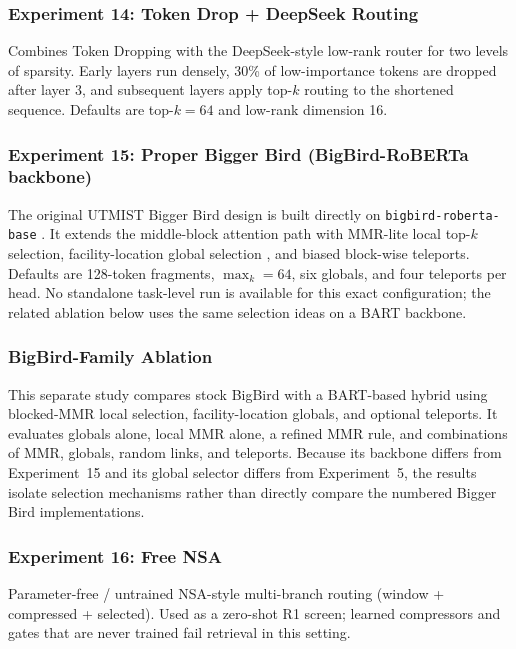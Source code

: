 \documentclass[11pt]{article}
\begin{document}
\subsubsection*{Experiment 14: Token Drop + DeepSeek Routing}
\label{exp:token-drop-deepseek}
Combines Token Dropping with the DeepSeek-style low-rank router for two levels
of sparsity. Early layers run densely, 30\% of low-importance tokens are
dropped after layer 3, and subsequent layers apply top-$k$ routing to the
shortened sequence. Defaults are top-$k=64$ and low-rank dimension 16.

\subsubsection*{Experiment 15: Proper Bigger Bird (BigBird-RoBERTa backbone)}
\label{exp:proper-bb}
The original UTMIST Bigger Bird design is built directly on
\texttt{bigbird-roberta-base} \citep{zaheer2020bigbird}. It extends the
middle-block attention path with MMR-lite local top-$k$ selection,
facility-location global selection \citep{lin2011submodular}, and biased
block-wise teleports. Defaults are 128-token fragments, $\max_k=64$, six
globals, and four teleports per head. No standalone task-level run is
available for this exact configuration; the related ablation below uses the
same selection ideas on a BART backbone.

\subsubsection*{BigBird-Family Ablation}
\label{exp:bigbird-family}
This separate study compares stock BigBird \citep{zaheer2020bigbird} with a
BART-based hybrid using blocked-MMR local selection, facility-location
globals, and optional teleports. It evaluates globals alone, local MMR alone,
a refined MMR rule, and combinations of MMR, globals, random links, and
teleports. Because its backbone differs from Experiment~15 and its global
selector differs from Experiment~5, the results isolate selection mechanisms
rather than directly compare the numbered Bigger Bird implementations.

\subsubsection*{Experiment 16: Free NSA}
Parameter-free / untrained NSA-style multi-branch routing (window +
compressed + selected). Used as a zero-shot R1 screen; learned compressors
and gates that are never trained fail retrieval in this setting.
\end{document}
